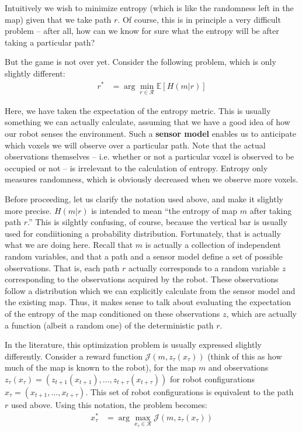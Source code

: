 \documentclass[12pt]{article}
\begin{document}
Intuitively we wish to minimize entropy (which is like the randomness left in the map) given that we take path $r$. Of course, this is in principle a very difficult problem -- after all, how can we know for sure what the entropy will be after taking a particular path?

But the game is not over yet. Consider the following problem, which is only slightly different:
\begin{align}
  r^* &= \arg \min_{r \in \mathcal{R}} \mathbb{E}[H(m | r)]
\end{align}

Here, we have taken the expectation of the entropy metric. This is usually something we can actually calculate, assuming that we have a good idea of how our robot senses the environment. Such a \textbf{sensor model} enables us to anticipate which voxels we will observe over a particular path. Note that the actual observations themselves -- i.e. whether or not a particular voxel is observed to be occupied or not -- is irrelevant to the calculation of entropy. Entropy only measures randomness, which is obviously decreased when we observe more voxels.

Before proceeding, let us clarify the notation used above, and make it slightly more precise. $H(m | r)$ is intended to mean ``the entropy of map $m$ after taking path $r$.'' This is silghtly confusing, of course, because the vertical bar is usually used for condiitioning a probability distribution. Fortunately, that is actually what we are doing here. Recall that $m$ is actually a collection of independent random variables, and that a path and a sensor model define a set of possible observations. That is, each path $r$ actually corresponds to a random variable $z$ corresponding to the observations acquired by the robot. These observations follow a distribution which we can explicitly calculate from the sensor model and the existing map. Thus, it makes sense to talk about evaluating the expectation of the entropy of the map conditioned on these observations $z$, which are actually a function (albeit a random one) of the deterministic path $r$.

In the literature, this optimization problem is usually expressed slightly differently. Consider a reward function $\mathcal{J}(m, z_{\tau}(x_{\tau}))$ (think of this as how much of the map is known to the robot), for the map $m$ and observations $z_{\tau}(x_{\tau}) = (z_{t + 1}(x_{t + 1}), \dots, z_{t + \tau}(x_{t + \tau}))$ for robot configurations $x_{\tau} = (x_{t + 1}, \dots, x_{t + \tau})$. This set of robot configurations is equivalent to the path $r$ used above. Using this notation, the problem becomes:
\begin{align}
  x_{\tau}^* &= \arg \max_{x_{\tau} \in \mathcal{R}} \mathcal{J}(m, z_{\tau}(x_{\tau}))
\end{align}
\end{document}
